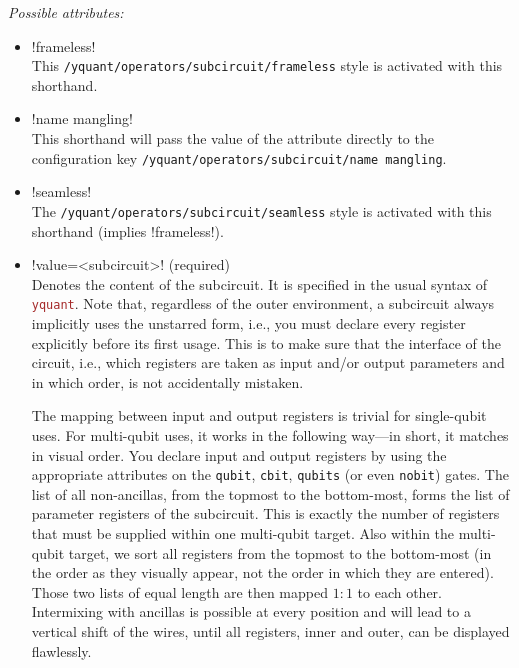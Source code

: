 \documentclass{scrartcl}
\def\pkg#1{\textcolor{brown}{\texttt{#1}}}
\def\ttlink{\link\texttt}
\def\Yquant{\pkg{yquant}}
\begin{document}
         \emph{Possible attributes:}
         \begin{itemize}
            \item {}\yquant!frameless! \\
               This \ttlink{/yquant/operators/subcircuit/frameless} style is activated with this shorthand.
            \item {}\yquant!name mangling! \\
               This shorthand will pass the value of the attribute directly to the configuration key \ttlink{/yquant/operators/subcircuit/name mangling}.
            \item {}\yquant!seamless! \\
               The \ttlink{/yquant/operators/subcircuit/seamless} style is activated with this shorthand (implies \yquant!frameless!).
            \item \yquant!value=<subcircuit>! (required) \\
               Denotes the content of the subcircuit.
               It is specified in the usual syntax of \Yquant.
               Note that, regardless of the outer environment, a subcircuit always implicitly uses the unstarred form, i.e., you must declare every register explicitly before its first usage.
               This is to make sure that the interface of the circuit, i.e., which registers are taken as input and/or output parameters and in which order, is not accidentally mistaken.

               The mapping between input and output registers is trivial for single\hyp qubit uses.
               For multi\hyp qubit uses, it works in the following way---in short, it matches in visual order.
               You declare input and output registers by using the appropriate attributes on the \ttlink{qubit}, \ttlink{cbit}, \ttlink{qubits} (or even \ttlink{nobit}) gates.
               The list of all non\hyp ancillas, from the topmost to the bottom\hyp most, forms the list of parameter registers of the subcircuit.
               This is exactly the number of registers that must be supplied within one multi\hyp qubit target.
               Also within the multi\hyp qubit target, we sort all registers from the topmost to the bottom\hyp most (in the order as they visually appear, not the order in which they are entered).
               Those two lists of equal length are then mapped $1:1$ to each other.
               Intermixing with ancillas is possible at every position and will lead to a vertical shift of the wires, until all registers, inner and outer, can be displayed flawlessly.


\end{itemize}
\end{document}
